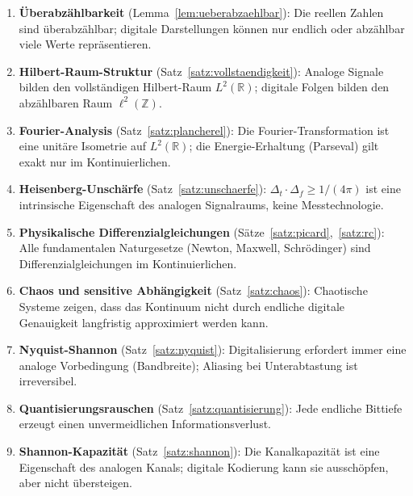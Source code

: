 ﻿\documentclass[a4paper,12pt]{article}
\theoremstyle{definition}
\begin{document}
\begin{enumerate}
\item \textbf{Überabzählbarkeit} (Lemma~\ref{lem:ueberabzaehlbar}):
    Die reellen Zahlen sind überabzählbar; digitale Darstellungen können nur
    endlich oder abzählbar viele Werte repräsentieren.

\item \textbf{Hilbert-Raum-Struktur} (Satz~\ref{satz:vollstaendigkeit}):
    Analoge Signale bilden den vollständigen Hilbert-Raum $L^2(\mathbb{R})$;
    digitale Folgen bilden den abzählbaren Raum $\ell^2(\mathbb{Z})$.

\item \textbf{Fourier-Analysis} (Satz~\ref{satz:plancherel}):
    Die Fourier-Transformation ist eine unitäre Isometrie auf $L^2(\mathbb{R})$;
    die Energie-Erhaltung (Parseval) gilt exakt nur im Kontinuierlichen.

\item \textbf{Heisenberg-Unschärfe} (Satz~\ref{satz:unschaerfe}):
    $\Delta_t \cdot \Delta_f \geq 1/(4\pi)$ ist eine intrinsische Eigenschaft
    des analogen Signalraums, keine Messtechnologie.

\item \textbf{Physikalische Differenzialgleichungen}
    (Sätze~\ref{satz:picard},~\ref{satz:rc}):
    Alle fundamentalen Naturgesetze (Newton, Maxwell, Schrödinger) sind
    Differenzialgleichungen im Kontinuierlichen.

\item \textbf{Chaos und sensitive Abhängigkeit} (Satz~\ref{satz:chaos}):
    Chaotische Systeme zeigen, dass das Kontinuum nicht durch endliche digitale
    Genauigkeit langfristig approximiert werden kann.

\item \textbf{Nyquist-Shannon} (Satz~\ref{satz:nyquist}):
    Digitalisierung erfordert immer eine analoge Vorbedingung (Bandbreite);
    Aliasing bei Unterabtastung ist irreversibel.

\item \textbf{Quantisierungsrauschen} (Satz~\ref{satz:quantisierung}):
    Jede endliche Bittiefe erzeugt einen unvermeidlichen Informationsverlust.

\item \textbf{Shannon-Kapazität} (Satz~\ref{satz:shannon}):
    Die Kanalkapazität ist eine Eigenschaft des analogen Kanals;
    digitale Kodierung kann sie ausschöpfen, aber nicht übersteigen.
\end{enumerate}
\end{document}
